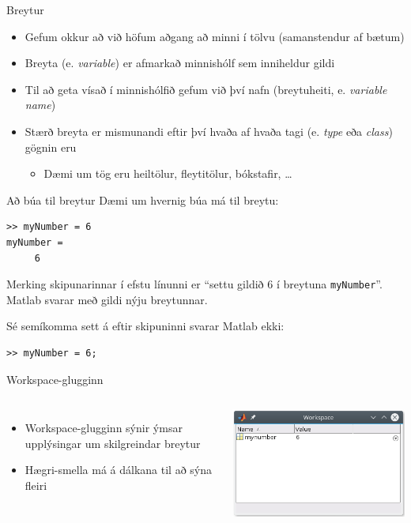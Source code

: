 \documentclass{beamer}
\begin{document}
\begin{frame}{Breytur}
\begin{itemize}
 \item Gefum okkur að við höfum aðgang að minni í tölvu (samanstendur af bætum)
 \item Breyta (e. \emph{variable}) er afmarkað minnishólf sem inniheldur gildi
 \item Til að geta vísað í minnishólfið gefum við því nafn (breytuheiti, e. \emph{variable name})
 \item Stærð breyta er mismunandi eftir því hvaða af hvaða tagi (e. \emph{type} eða \emph{class}) gögnin eru
 \begin{itemize}
  \item Dæmi um tög eru heiltölur, fleytitölur, bókstafir, \ldots
 \end{itemize}
\end{itemize}
\end{frame}

\begin{frame}[fragile]{Að búa til breytur}
Dæmi um hvernig búa má til breytu:
\begin{verbatim}
>> myNumber = 6
myNumber =  
     6
\end{verbatim}
Merking skipunarinnar í efstu línunni er ``settu gildið $6$ í breytuna \texttt{myNumber}''. Matlab svarar með gildi nýju breytunnar.

Sé semíkomma sett á eftir skipuninni svarar Matlab ekki:
\begin{verbatim}
>> myNumber = 6;
\end{verbatim}
\end{frame}

\begin{frame}{Workspace-glugginn}
\begin{columns}
\begin{itemize}
 \item Workspace-glugginn sýnir ýmsar upplýsingar um skilgreindar breytur
 \item Hægri-smella má á dálkana til að sýna fleiri
\end{itemize}
\includegraphics[width=\linewidth]{../Pics/workspace-window}
\end{columns}
\end{frame}
\end{document}
